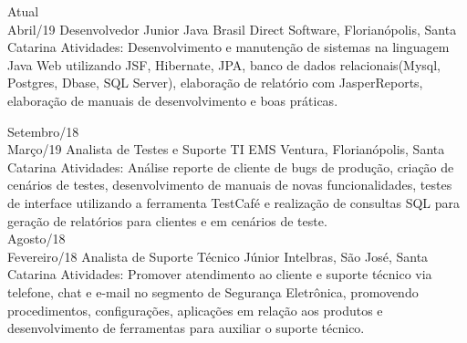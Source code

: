 \documentclass[]{friggeri-cv}
\begin{document}
\begin{entrylist}

  \entry
    {Atual \\Abril/19}
    {Desenvolvedor Junior Java}
    {Brasil Direct Software, Florianópolis, Santa Catarina}
    {Atividades: Desenvolvimento e manutenção de sistemas na linguagem Java Web utilizando JSF, Hibernate, JPA, banco de dados relacionais(Mysql, Postgres, Dbase, SQL Server), elaboração de relatório com JasperReports, elaboração de manuais de desenvolvimento e boas práticas.\\}
  
  \entry
    {Setembro/18 \\ Março/19}
    {Analista de Testes e Suporte TI}
    {EMS Ventura, Florianópolis, Santa Catarina}
    {Atividades: Análise reporte de cliente de bugs de produção, criação de cenários de testes, desenvolvimento de manuais de novas funcionalidades, testes de interface utilizando a ferramenta TestCafé e realização de consultas SQL para geração de relatórios para clientes e em cenários de teste.}
    \\
    
  \entry
    {Agosto/18 \\Fevereiro/18}
    {Analista de Suporte Técnico Júnior}
    {Intelbras, São José, Santa Catarina}
    {Atividades: Promover atendimento ao cliente e suporte técnico via telefone, chat e e-mail no segmento de Segurança Eletrônica, promovendo procedimentos, configurações, aplicações em relação aos produtos e desenvolvimento de ferramentas para auxiliar o suporte técnico.\\}
  
  
    
    
\end{entrylist}
\end{document}
